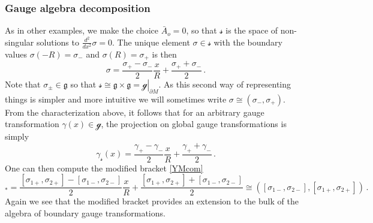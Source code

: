 \documentclass[11pt,a4paper]{article}
\def\calsg{{\boldsymbol{\mathscr g}}}
\def\calss{{\boldsymbol{\mathscr s}}}
\begin{document}
    \subsubsection{Gauge algebra decomposition}
    As in other examples, we make the choice $\bar A_o=0$, so that $\calss$ is the space of non-singular solutions to $\frac{d^2}{dx^2}\sigma=0$. The unique element $\sigma\in\calss$ with the boundary values $\sigma(-R)=\sigma_-$ and $\sigma(R)=\sigma_+$ is then
    \begin{equation}
    \sigma=\frac{\sigma_+-\sigma_-}{2}\frac{x}{R}+\frac{\sigma_++\sigma_-}{2}  \,.
    \end{equation}
    Note that  $\sigma_\pm\in \mathfrak{g}$ so that $\calss\cong\mathfrak{g}\times\mathfrak{g}=\left.\calsg\right|_{\partial M}$.  As this second way of representing things is simpler and more intuitive we will sometimes write $\sigma\cong(\sigma_-,\sigma_+)$. 
    From the characterization above, it follows that for an arbitrary gauge transformation $\gamma(x)\in\calsg$, the projection on global gauge transformations is simply
    \begin{equation}
    \gamma_\calss(x)=\frac{\gamma_+-\gamma_-}{2}\frac{x}{R}+\frac{\gamma_++\gamma_-}{2}  \,.    \label{1dproj}\end{equation}
    One can then compute the modified bracket \eqref{YMcom}
    \begin{equation*}
    [\sigma_1,\sigma_2]_*=\frac{[\sigma_{1+},\sigma_{2+}]-[\sigma_{1-},\sigma_{2-}]}{2}\frac{x}{R}+\frac{[\sigma_{1+},\sigma_{2+}]+[\sigma_{1-},\sigma_{2-}]}{2}\cong ([\sigma_{1-},\sigma_{2-}],[\sigma_{1+},\sigma_{2+}])  \,.
    \end{equation*}
   Again we see that the modified bracket provides an extension to the bulk of the algebra of boundary gauge transformations. 
   
\end{document}
